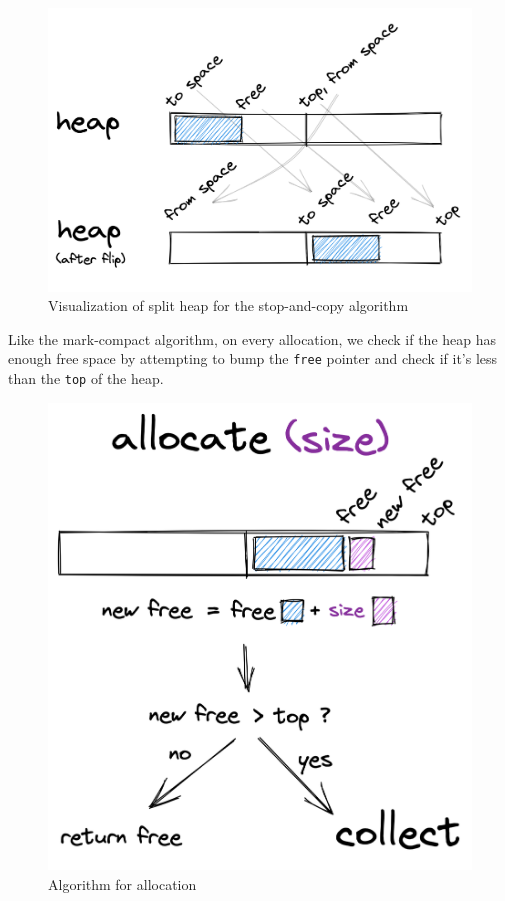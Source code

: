 \documentclass[index]{subfiles}
\begin{document}
\begin{figure}[H]
    \centering
    \includegraphics[scale=0.14]{pics/split-heap-diagram.png}
    \caption{Visualization of split heap for the stop-and-copy algorithm}
\end{figure}

Like the mark-compact algorithm, on every allocation, we check if the heap has enough free space by attempting to bump the \verb+free+ pointer and check if it's less than the \verb+top+ of the heap.

\begin{figure}[H]
    \centering
    \includegraphics[scale=0.14]{pics/allocation.png}
    \caption{Algorithm for allocation}
\end{figure}
\end{document}
